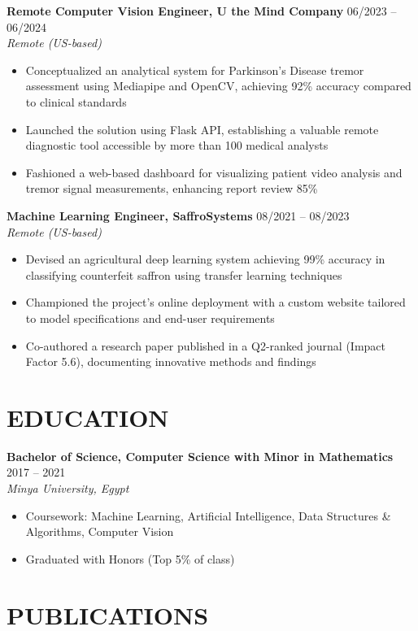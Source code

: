 \documentclass[11pt]{article}
\begin{document}
\textbf{Remote Computer Vision Engineer, U the Mind Company} \hfill 06/2023 – 06/2024\\
\textit{Remote (US-based)}
\begin{itemize}
\item Conceptualized an analytical system for Parkinson's Disease tremor assessment using Mediapipe and OpenCV, achieving 92\% accuracy compared to clinical standards
\item Launched the solution using Flask API, establishing a valuable remote diagnostic tool accessible by more than 100 medical analysts
\item Fashioned a web-based dashboard for visualizing patient video analysis and tremor signal measurements, enhancing report review 85\%
\end{itemize}

\textbf{Machine Learning Engineer, SaffroSystems} \hfill 08/2021 – 08/2023\\
\textit{Remote (US-based)}
\begin{itemize}
\item Devised an agricultural deep learning system achieving 99\% accuracy in classifying counterfeit saffron using transfer learning techniques
\item Championed the project's online deployment with a custom website tailored to model specifications and end-user requirements
\item Co-authored a research paper published in a Q2-ranked journal (Impact Factor 5.6), documenting innovative methods and findings
\end{itemize}

\section{EDUCATION}

\textbf{Bachelor of Science, Computer Science with Minor in Mathematics} \hfill 2017 – 2021\\
\textit{Minya University, Egypt}
\begin{itemize}
\item Coursework: Machine Learning, Artificial Intelligence, Data Structures \& Algorithms, Computer Vision
\item Graduated with Honors (Top 5\% of class)
\end{itemize}

\section{PUBLICATIONS}
\end{document}
